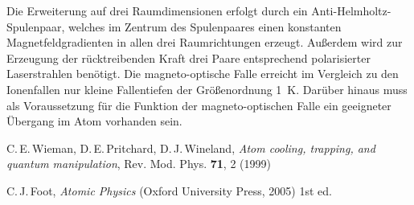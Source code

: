 \documentclass[twocolumn]{revtex4}
\begin{document}
Die Erweiterung auf drei Raumdimensionen erfolgt durch ein Anti-Helmholtz-Spulenpaar, welches im Zentrum des Spulenpaares einen konstanten Magnetfeldgradienten in allen drei Raumrichtungen erzeugt.
Außerdem wird zur Erzeugung der rücktreibenden Kraft drei Paare entsprechend polarisierter Laserstrahlen benötigt.
Die magneto-optische Falle erreicht im Vergleich zu den Ionenfallen nur kleine Fallentiefen der Größenordnung \SI{1}{K}.
Darüber hinaus muss als Voraussetzung für die Funktion der magneto-optischen Falle ein geeigneter Übergang im Atom vorhanden sein.


\begin{thebibliography}{}
C.\,E.\,Wieman, D.\,E.\,Pritchard, D.\,J.\,Wineland, {\it Atom cooling, trapping, and quantum manipulation}, Rev. Mod. Phys. \textbf{71}, 2 (1999)

C.\,J.\,Foot, {\it Atomic Physics} (Oxford University Press, 2005) 1st ed.

\end{thebibliography}
\end{document}
